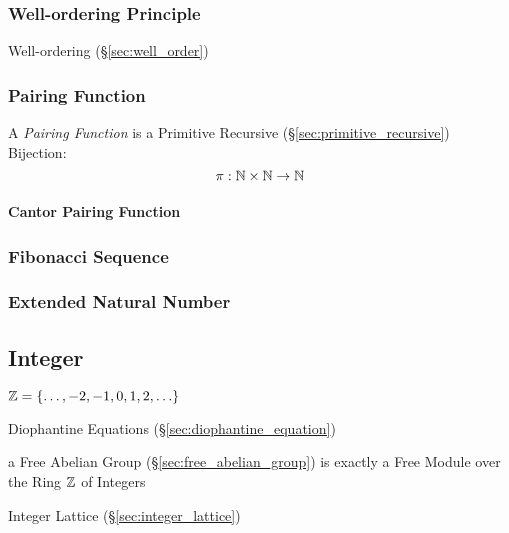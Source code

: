 \subsubsection{Well-ordering Principle}\label{sec:wellordering_principle}

Well-ordering (\S\ref{sec:well_order})



\subsubsection{Pairing Function}\label{sec:pairing_function}

A \emph{Pairing Function} is a Primitive Recursive
(\S\ref{sec:primitive_recursive}) Bijection:
\[
  \pi : \mathbb{N} \times \mathbb{N} \rightarrow \mathbb{N}
\]



\paragraph{Cantor Pairing Function}\label{sec:cantor_pairing}\hfill



\subsubsection{Fibonacci Sequence}\label{sec:fibonacci_sequence}

\subsubsection{Extended Natural Number}\label{sec:extended_natural}



\subsection{Integer}\label{sec:integer}

$\mathbb{Z} = \{ \ldots, -2, -1, 0, 1, 2, \ldots \}$

\fist Diophantine Equations (\S\ref{sec:diophantine_equation})

\fist a Free Abelian Group (\S\ref{sec:free_abelian_group}) is exactly a Free
Module over the Ring $\mathbb{Z}$ of Integers

\fist Integer Lattice (\S\ref{sec:integer_lattice})

